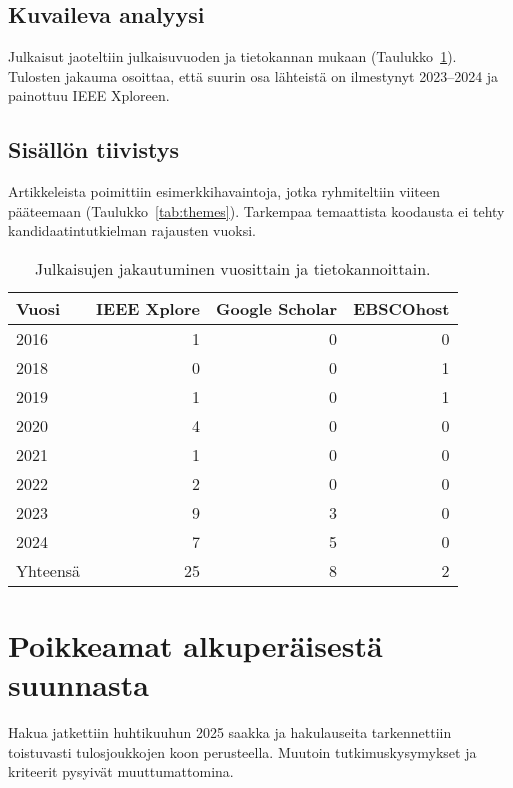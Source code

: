 \documentclass[bscthesis,finnish,oneside,biblatex]{uefcsthesis}
\begin{document}
\subsection{Kuvaileva analyysi}
Julkaisut jaoteltiin julkaisuvuoden ja tietokannan mukaan
(Taulukko~\ref{tab:descriptive}). Tulosten jakauma osoittaa, että
suurin osa lähteistä on ilmestynyt 2023–2024
ja painottuu IEEE Xploreen.

\subsection{Sisällön tiivistys}
Artikkeleista poimittiin esimerkkihavaintoja, jotka ryhmiteltiin
viiteen pääteemaan (Taulukko~\ref{tab:themes}).
Tarkempaa temaattista koodausta ei tehty kandidaatintutkielman
rajausten vuoksi.

\begin{table}[htbp]
  \centering
  \footnotesize
  \caption{Julkaisujen jakautuminen vuosittain ja tietokannoittain.}
  \label{tab:descriptive}
  \begin{tabular}{lrrr}
    \toprule
    \textbf{Vuosi} & \textbf{IEEE Xplore} & \textbf{Google Scholar} & \textbf{EBSCOhost} \\
    \midrule
    2016 & 1 & 0 & 0 \\
    2018 & 0 & 0 & 1 \\
    2019 & 1 & 0 & 1 \\
    2020 & 4 & 0 & 0 \\
    2021 & 1 & 0 & 0 \\
    2022 & 2 & 0 & 0 \\
    2023 & 9 & 3 & 0 \\
    2024 & 7 & 5 & 0 \\
    \midrule
    Yhteensä & 25 & 8 & 2 \\
    \bottomrule
  \end{tabular}
\end{table}

\section{Poikkeamat alkuperäisestä suunnasta}
\label{sec:deviations}

Hakua jatkettiin huhtikuuhun 2025 saakka ja
hakulauseita tarkennettiin toistuvasti tulosjoukkojen koon perusteella.
Muutoin tutkimuskysymykset ja kriteerit pysyivät muuttumattomina.


\end{document}
